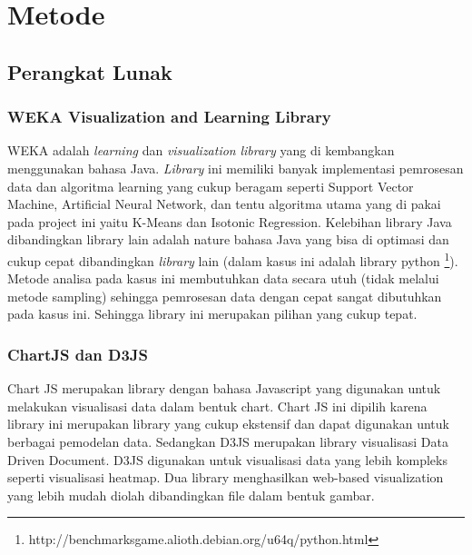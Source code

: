 \documentclass{article}
\begin{document}
\section{Metode}

\subsection{Perangkat Lunak}

\subsubsection{WEKA Visualization and Learning Library}
\begin{adjustwidth}{4em}{0pt}

\hspace{\parindent}WEKA adalah \textit{learning} dan \textit{visualization} \textit{library} yang di kembangkan menggunakan bahasa Java. \textit{Library} ini memiliki banyak implementasi pemrosesan data dan algoritma learning yang cukup beragam seperti Support Vector Machine, Artificial Neural Network, dan tentu algoritma utama yang di pakai pada project ini yaitu K-Means dan Isotonic Regression. Kelebihan library Java dibandingkan library lain adalah nature bahasa Java yang bisa di optimasi dan cukup cepat dibandingkan \textit{library} lain (dalam kasus ini adalah library python \footnote{http://benchmarksgame.alioth.debian.org/u64q/python.html}). Metode analisa pada kasus  ini membutuhkan data secara utuh (tidak melalui metode sampling) sehingga pemrosesan data dengan cepat sangat dibutuhkan pada kasus ini. Sehingga library ini merupakan pilihan yang cukup tepat.

\end{adjustwidth}

\subsubsection{ChartJS dan D3JS}
\begin{adjustwidth}{4em}{0pt}
	
\hspace{\parindent}Chart JS merupakan library dengan bahasa Javascript yang digunakan untuk melakukan visualisasi data dalam bentuk chart. Chart JS ini dipilih karena library ini merupakan library yang cukup ekstensif dan dapat digunakan untuk berbagai pemodelan data. Sedangkan D3JS merupakan library visualisasi Data Driven Document. D3JS digunakan untuk visualisasi data yang lebih kompleks seperti visualisasi heatmap. Dua library menghasilkan web-based visualization yang lebih mudah diolah dibandingkan file dalam bentuk gambar.

\end{adjustwidth}
\end{document}

